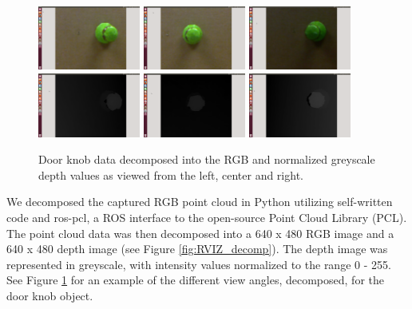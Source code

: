 \documentclass{article}
\begin{document}
\begin{figure}
    \centering
    \includegraphics[width=0.3\textwidth]{DH_RGB_L.png}
    \includegraphics[width=0.3\textwidth]{DH_RGB_C.png}
    \includegraphics[width=0.3\textwidth]{DH_RGB_R.png}
    \includegraphics[width=0.3\textwidth]{DH_D_L.png}
    \includegraphics[width=0.3\textwidth]{DH_D_C.png}
    \includegraphics[width=0.3\textwidth]{DH_D_R.png}
    \caption{Door knob data decomposed into the RGB and normalized greyscale depth values as viewed from the left, center and right.}
    \label{fig:decomposition}
    
\end{figure}We decomposed the captured RGB point cloud in Python utilizing self-written code and ros-pcl, a ROS interface to the open-source Point Cloud Library (PCL)\cite{pcl, rospcl}. The point cloud data was then decomposed into a 640 x 480 RGB image and a 640 x 480 depth image (see Figure \ref{fig:RVIZ_decomp}). The depth image was represented in greyscale, with intensity values normalized to the range 0 - 255. See Figure \ref{fig:decomposition} for an example of the different view angles, decomposed, for the door knob object.
\end{document}
